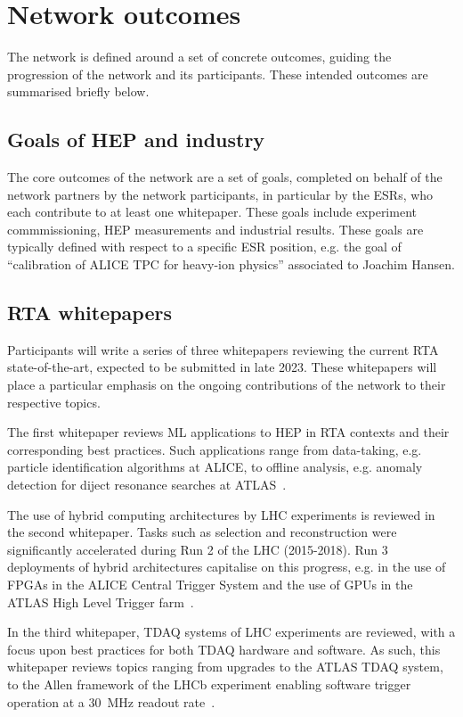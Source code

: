 \section{Network outcomes}
\label{outcomes}
The network is defined around a set of concrete outcomes, guiding the progression of the network and its participants. These intended outcomes are summarised briefly below.

\subsection{Goals of HEP and industry}
\label{goals}
The core outcomes of the network are a set of goals, completed on behalf of the network partners by the network participants, in particular by the ESRs, who each contribute to at least one whitepaper.  These goals include experiment commmissioning, HEP measurements and industrial results. These goals are typically defined with respect to a specific ESR position, e.g. the goal of ``calibration of ALICE TPC for heavy-ion physics'' associated to Joachim Hansen.

\subsection{RTA whitepapers}
\label{whitepapers}
Participants will write a series of three whitepapers reviewing the current RTA state-of-the-art, expected to be submitted in late 2023. These whitepapers will place a particular emphasis on the ongoing contributions of the network to their respective topics.

The first whitepaper reviews ML applications to HEP in RTA contexts and their corresponding best practices. Such applications range from data-taking, e.g. particle identification algorithms at ALICE, to offline analysis, e.g. anomaly detection for diject resonance searches at ATLAS~\cite{ALICE-PID, ATLAS-dijet}.

The use of hybrid computing architectures by LHC experiments is reviewed in the second whitepaper. Tasks such as selection and reconstruction were significantly accelerated during Run 2 of the LHC (2015-2018). Run 3 deployments of hybrid architectures capitalise on this progress, e.g. in the use of FPGAs in the ALICE Central Trigger System and the use of GPUs in the ATLAS High Level Trigger farm~\cite{ALICE-CTS, CMS-HLT-farm}.

In the third whitepaper, TDAQ systems of LHC experiments are reviewed, with a focus upon best practices for both TDAQ hardware and software. As such, this whitepaper reviews topics ranging from upgrades to the ATLAS TDAQ system, to the Allen framework of the LHCb experiment enabling software trigger operation at a 30~MHz readout rate~\cite{ATLAS-TDAQ, LHCb-Allen}.

